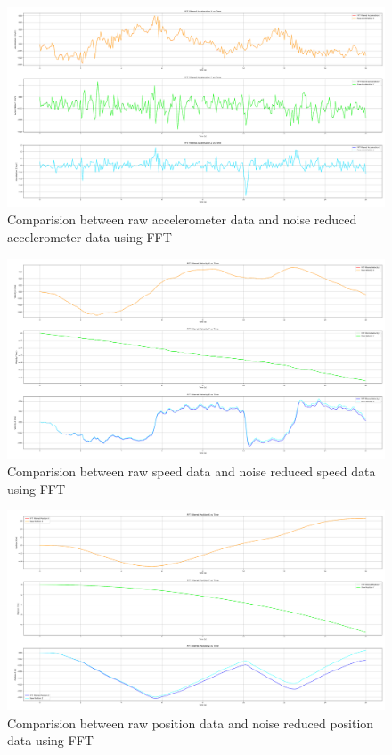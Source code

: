 \documentclass{article}
\begin{document}
\FloatBarrier
\begin{figure}[h]
    \centering
    \includegraphics[width=\textwidth]{2_1_9_1.png}
    \caption{Comparision between raw accelerometer data and noise reduced accelerometer data using FFT}
    \label{fig:accel_fft}
\end{figure}
\FloatBarrier
\begin{figure}[h]
    \centering
    \includegraphics[width=\textwidth]{2_1_9_2.png}
    \caption{Comparision between raw speed data and noise reduced speed data using FFT}
    \label{fig:speed_fft}
\end{figure}
\FloatBarrier
\begin{figure}[h]
    \centering
    \includegraphics[width=\textwidth]{2_1_9_3.png}
    \caption{Comparision between raw position data and noise reduced position data using FFT}
    \label{fig:position_fft}
\end{figure}
\end{document}

